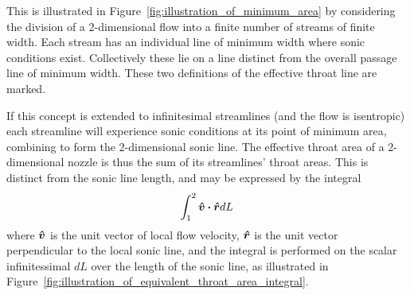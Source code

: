 \documentclass[11pt, twoside]{report}
\begin{document}
This is illustrated in Figure~\ref{fig:illustration_of_minimum_area} by considering the division of a 2-dimensional flow into a finite number of streams of finite width. Each stream has an individual line of minimum width where sonic conditions exist. Collectively these lie on a line distinct from the overall passage line of minimum width. These two definitions of the effective throat line are marked.

If this concept is extended to infinitesimal streamlines (and the flow is isentropic) each streamline will experience sonic conditions at its point of minimum area, combining to form the 2-dimensional sonic line. The effective throat area of a 2-dimensional nozzle is thus the sum of its streamlines' throat areas. This is distinct from the sonic line length, and may be expressed by the integral
\begin{equation}
	\int_{1}^2 \vu*{v} \vdot \vu*{r} dL
\end{equation}
where $\vu*{v}$ is the unit vector of local flow velocity, $\vu*{r}$ is the unit vector perpendicular to the local sonic line, and the integral is performed on the scalar infinitessimal $dL$ over the length of the sonic line, as illustrated in Figure~\ref{fig:illustration_of_equivalent_throat_area_integral}.
 		
\end{document}
